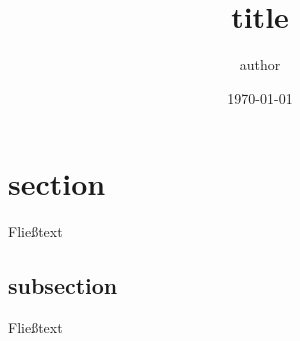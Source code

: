 \documentclass[a4paper,12pt]{article}
\title{title}
\author{author}
\date{\today}
\begin{document}
\maketitle

\newpage

\tableofcontents

\newpage

\section{section}

Fließtext

\subsection{subsection}

Fließtext
\end{document}
